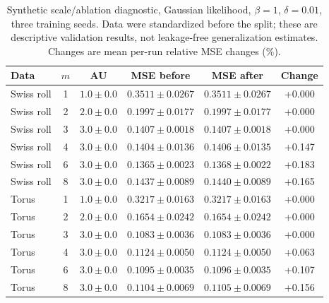 \begin{table}[H]
\caption{Synthetic scale/ablation diagnostic, Gaussian likelihood, $\beta=1$, $\delta=0.01$, three training seeds. Data were standardized before the split; these are descriptive validation results, not leakage-free generalization estimates. Changes are mean per-run relative MSE changes (\%).}\label{tab:synthetic}
\footnotesize
\setlength{\tabcolsep}{3.5pt}
\begin{tabular*}{\textwidth}{@{\extracolsep{\fill}}lccccc@{}}
\toprule
Data & $m$ & AU & MSE before & MSE after & Change \\
\midrule
Swiss roll & 1 & $1.0 \pm 0.0$ & $0.3511 \pm 0.0267$ & $0.3511 \pm 0.0267$ & +0.000 \\
Swiss roll & 2 & $2.0 \pm 0.0$ & $0.1997 \pm 0.0177$ & $0.1997 \pm 0.0177$ & +0.000 \\
Swiss roll & 3 & $3.0 \pm 0.0$ & $0.1407 \pm 0.0018$ & $0.1407 \pm 0.0018$ & +0.000 \\
Swiss roll & 4 & $3.0 \pm 0.0$ & $0.1404 \pm 0.0136$ & $0.1406 \pm 0.0135$ & +0.147 \\
Swiss roll & 6 & $3.0 \pm 0.0$ & $0.1365 \pm 0.0023$ & $0.1368 \pm 0.0022$ & +0.183 \\
Swiss roll & 8 & $3.0 \pm 0.0$ & $0.1437 \pm 0.0089$ & $0.1440 \pm 0.0089$ & +0.165 \\
Torus & 1 & $1.0 \pm 0.0$ & $0.3217 \pm 0.0163$ & $0.3217 \pm 0.0163$ & +0.000 \\
Torus & 2 & $2.0 \pm 0.0$ & $0.1654 \pm 0.0242$ & $0.1654 \pm 0.0242$ & +0.000 \\
Torus & 3 & $3.0 \pm 0.0$ & $0.1083 \pm 0.0036$ & $0.1083 \pm 0.0036$ & +0.000 \\
Torus & 4 & $3.0 \pm 0.0$ & $0.1124 \pm 0.0050$ & $0.1124 \pm 0.0050$ & +0.063 \\
Torus & 6 & $3.0 \pm 0.0$ & $0.1095 \pm 0.0035$ & $0.1096 \pm 0.0035$ & +0.107 \\
Torus & 8 & $3.0 \pm 0.0$ & $0.1104 \pm 0.0069$ & $0.1105 \pm 0.0069$ & +0.156 \\
\bottomrule
\end{tabular*}
\end{table}
